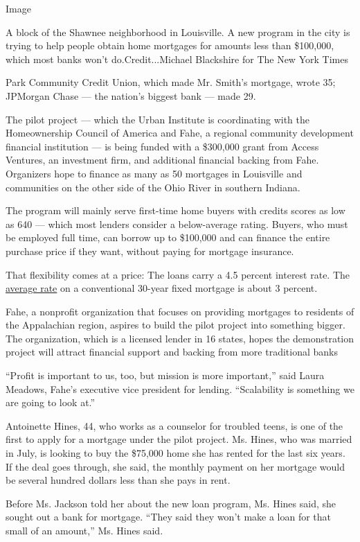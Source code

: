 Image

A block of the Shawnee neighborhood in Louisville. A new program in the
city is trying to help people obtain home mortgages for amounts less
than \$100,000, which most banks won't do.Credit...Michael Blackshire
for The New York Times

Park Community Credit Union, which made Mr. Smith's mortgage, wrote 35;
JPMorgan Chase --- the nation's biggest bank --- made 29.

The pilot project --- which the Urban Institute is coordinating with the
Homeownership Council of America and Fahe, a regional community
development financial institution --- is being funded with a \$300,000
grant from Access Ventures, an investment firm, and additional financial
backing from Fahe. Organizers hope to finance as many as 50 mortgages in
Louisville and communities on the other side of the Ohio River in
southern Indiana.

The program will mainly serve first-time home buyers with credits scores
as low as 640 --- which most lenders consider a below-average rating.
Buyers, who must be employed full time, can borrow up to \$100,000 and
can finance the entire purchase price if they want, without paying for
mortgage insurance.

That flexibility comes at a price: The loans carry a 4.5 percent
interest rate. The \href{http://www.freddiemac.com/pmms/}{average rate}
on a conventional 30-year fixed mortgage is about 3 percent.

Fahe, a nonprofit organization that focuses on providing mortgages to
residents of the Appalachian region, aspires to build the pilot project
into something bigger. The organization, which is a licensed lender in
16 states, hopes the demonstration project will attract financial
support and backing from more traditional banks

``Profit is important to us, too, but mission is more important,'' said
Laura Meadows, Fahe's executive vice president for lending.
``Scalability is something we are going to look at.''

Antoinette Hines, 44, who works as a counselor for troubled teens, is
one of the first to apply for a mortgage under the pilot project. Ms.
Hines, who was married in July, is looking to buy the \$75,000 home she
has rented for the last six years. If the deal goes through, she said,
the monthly payment on her mortgage would be several hundred dollars
less than she pays in rent.

Before Ms. Jackson told her about the new loan program, Ms. Hines said,
she sought out a bank for mortgage. ``They said they won't make a loan
for that small of an amount,'' Ms. Hines said.

